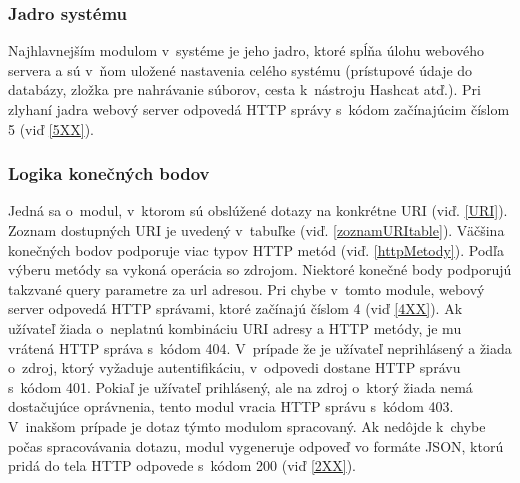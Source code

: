 \documentclass[slovak]{fitthesis}
\begin{document}
\subsubsection{Jadro systému}
Najhlavnejším modulom v~systéme je jeho jadro, ktoré spĺňa úlohu webového servera a sú v~ňom uložené nastavenia celého systému (prístupové údaje do databázy, zložka pre nahrávanie súborov, cesta k~nástroju Hashcat atď.). Pri zlyhaní jadra webový server odpovedá HTTP správy s~kódom začínajúcim číslom 5 (viď \ref{5XX}).


\subsubsection{Logika konečných bodov}
Jedná sa o~modul, v~ktorom sú obslúžené dotazy na konkrétne URI (viď. \ref{URI}). Zoznam dostupných URI je uvedený v~tabuľke (viď. \ref{zoznamURItable}). Väčšina konečných bodov podporuje viac typov HTTP metód (viď. \ref{httpMetody}). Podľa výberu metódy sa vykoná operácia so zdrojom. Niektoré konečné body podporujú takzvané query parametre za url adresou. Pri chybe v~tomto module, webový server odpovedá HTTP správami, ktoré začínajú číslom 4 (viď \ref{4XX}). Ak užívateľ žiada o~neplatnú kombináciu URI adresy a HTTP metódy, je mu vrátená HTTP správa s~kódom 404. V~prípade že je užívateľ neprihlásený a žiada o~zdroj, ktorý vyžaduje autentifikáciu, v~odpovedi dostane HTTP správu s~kódom 401. Pokiaľ je užívateľ prihlásený, ale na zdroj o~ktorý žiada nemá dostačujúce oprávnenia, tento modul vracia HTTP správu s~kódom 403. V~inakšom prípade je dotaz týmto modulom spracovaný. Ak nedôjde k~chybe počas spracovávania dotazu, modul vygeneruje odpoveď vo formáte JSON, ktorú pridá do tela HTTP odpovede s~kódom 200 (viď \ref{2XX}).
\end{document}
